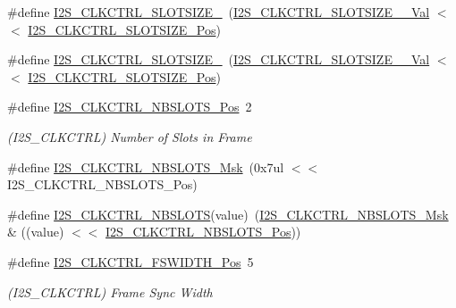 \begin{DoxyCompactItemize}
\item 
\#define \mbox{\hyperlink{group___s_a_m_d21___i2_s_gad58c0aac2d553c0dc3f93b7b5c24bc73}{I2\+S\+\_\+\+C\+L\+K\+C\+T\+R\+L\+\_\+\+S\+L\+O\+T\+S\+I\+Z\+E\+\_}}~(\mbox{\hyperlink{group___s_a_m_d21___i2_s_gabbc9d2ad05bbc8e24cdc97dcc5ffdd04}{I2\+S\+\_\+\+C\+L\+K\+C\+T\+R\+L\+\_\+\+S\+L\+O\+T\+S\+I\+Z\+E\+\_\+\_\+\+Val}}   $<$$<$ \mbox{\hyperlink{group___s_a_m_d21___i2_s_ga3790543c148a2adda023e411fd6595ad}{I2\+S\+\_\+\+C\+L\+K\+C\+T\+R\+L\+\_\+\+S\+L\+O\+T\+S\+I\+Z\+E\+\_\+\+Pos}})
\item 
\#define \mbox{\hyperlink{group___s_a_m_d21___i2_s_ga7996024acd6861fcddfbaf3d73618f29}{I2\+S\+\_\+\+C\+L\+K\+C\+T\+R\+L\+\_\+\+S\+L\+O\+T\+S\+I\+Z\+E\+\_}}~(\mbox{\hyperlink{group___s_a_m_d21___i2_s_gaaee0ee592d4468e2abf681def2ad82b7}{I2\+S\+\_\+\+C\+L\+K\+C\+T\+R\+L\+\_\+\+S\+L\+O\+T\+S\+I\+Z\+E\+\_\+\_\+\+Val}}   $<$$<$ \mbox{\hyperlink{group___s_a_m_d21___i2_s_ga3790543c148a2adda023e411fd6595ad}{I2\+S\+\_\+\+C\+L\+K\+C\+T\+R\+L\+\_\+\+S\+L\+O\+T\+S\+I\+Z\+E\+\_\+\+Pos}})
\item 
\#define \mbox{\hyperlink{group___s_a_m_d21___i2_s_gae01bc499f135be63219ee2c6444c05b3}{I2\+S\+\_\+\+C\+L\+K\+C\+T\+R\+L\+\_\+\+N\+B\+S\+L\+O\+T\+S\+\_\+\+Pos}}~2
\begin{DoxyCompactList}\small\item\em (I2\+S\+\_\+\+C\+L\+K\+C\+T\+RL) Number of Slots in Frame \end{DoxyCompactList}\item 
\#define \mbox{\hyperlink{group___s_a_m_d21___i2_s_gaa4107f2fd48ed25a1c282061c77d7009}{I2\+S\+\_\+\+C\+L\+K\+C\+T\+R\+L\+\_\+\+N\+B\+S\+L\+O\+T\+S\+\_\+\+Msk}}~(0x7ul $<$$<$ I2\+S\+\_\+\+C\+L\+K\+C\+T\+R\+L\+\_\+\+N\+B\+S\+L\+O\+T\+S\+\_\+\+Pos)
\item 
\#define \mbox{\hyperlink{group___s_a_m_d21___i2_s_gad634b27b89efb879319ab451d344657f}{I2\+S\+\_\+\+C\+L\+K\+C\+T\+R\+L\+\_\+\+N\+B\+S\+L\+O\+TS}}(value)~(\mbox{\hyperlink{group___s_a_m_d21___i2_s_gaa4107f2fd48ed25a1c282061c77d7009}{I2\+S\+\_\+\+C\+L\+K\+C\+T\+R\+L\+\_\+\+N\+B\+S\+L\+O\+T\+S\+\_\+\+Msk}} \& ((value) $<$$<$ \mbox{\hyperlink{group___s_a_m_d21___i2_s_gae01bc499f135be63219ee2c6444c05b3}{I2\+S\+\_\+\+C\+L\+K\+C\+T\+R\+L\+\_\+\+N\+B\+S\+L\+O\+T\+S\+\_\+\+Pos}}))
\item 
\#define \mbox{\hyperlink{group___s_a_m_d21___i2_s_ga68fd7a78e998d738a74bf6a56a47a082}{I2\+S\+\_\+\+C\+L\+K\+C\+T\+R\+L\+\_\+\+F\+S\+W\+I\+D\+T\+H\+\_\+\+Pos}}~5
\begin{DoxyCompactList}\small\item\em (I2\+S\+\_\+\+C\+L\+K\+C\+T\+RL) Frame Sync Width \end{DoxyCompactList}\item 

\end{DoxyCompactItemize}
